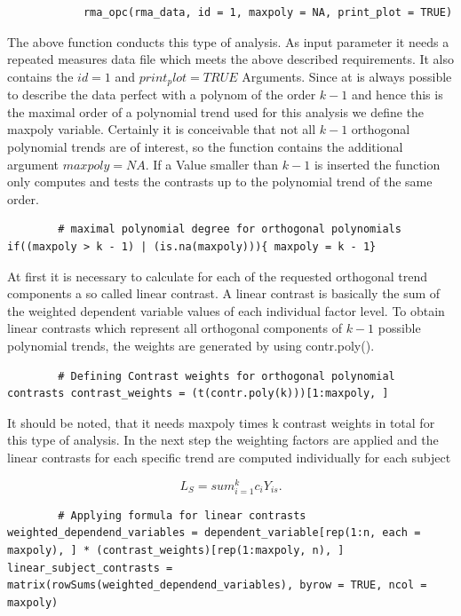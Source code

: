 \documentclass[11pt]{article}
\begin{document}
		\begin{lstlisting}
			rma_opc(rma_data, id = 1, maxpoly = NA, print_plot = TRUE)
		\end{lstlisting}
		
		The above function conducts this type of analysis. As input parameter it needs a repeated measures data file which meets the above described requirements. It also contains the $id = 1$ and $print_plot = TRUE$ Arguments. Since at is always possible to describe the data perfect with a polynom of the order $k - 1$ and hence this is the maximal order of a polynomial trend used for this analysis we define the maxpoly variable. Certainly it is conceivable that not all $k - 1$ orthogonal polynomial trends are of interest, so the function contains the additional argument $maxpoly = NA$. If a Value smaller than $k - 1$ is inserted the function only computes and tests the contrasts up to the polynomial trend of the same order.\\
		
		
		\begin{lstlisting}
		# maximal polynomial degree for orthogonal polynomials if((maxpoly > k - 1) | (is.na(maxpoly))){ maxpoly = k - 1}
		\end{lstlisting}
		
		At first it is necessary to calculate for each of the requested orthogonal trend components a so called linear contrast. A linear contrast is basically the sum of the weighted dependent variable values of each individual factor level. To obtain linear contrasts which represent all orthogonal components of $k - 1$ possible polynomial trends, the weights are generated by using contr.poly().\\
		
		\begin{lstlisting}
		# Defining Contrast weights for orthogonal polynomial contrasts contrast_weights = (t(contr.poly(k)))[1:maxpoly, ]
		\end{lstlisting}
		
		It should be noted, that it needs maxpoly times k contrast weights in total for this type of analysis. In the next step the weighting factors are applied and the linear contrasts for each specific trend are computed individually for each subject
		
		\begin{equation}
		L_S = sum_{i=1}^{k}c_iY_{is}.
		\end{equation}
		
		\begin{lstlisting}
		# Applying formula for linear contrasts weighted_dependend_variables = dependent_variable[rep(1:n, each = maxpoly), ] * (contrast_weights)[rep(1:maxpoly, n), ] linear_subject_contrasts = matrix(rowSums(weighted_dependend_variables), byrow = TRUE, ncol = maxpoly)
		\end{lstlisting}
		
\end{document}
